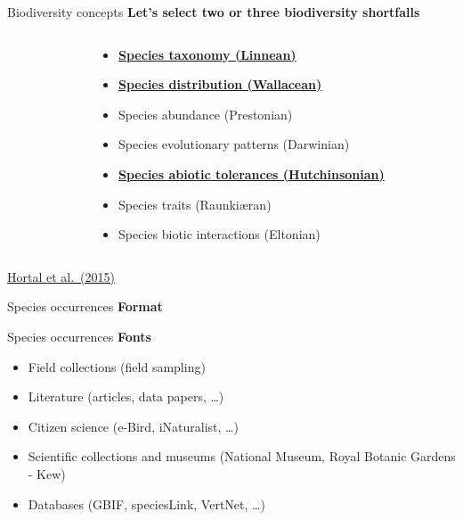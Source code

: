 \documentclass[
  ignorenonframetext,
]{beamer}
\providecommand{\tightlist}{%
  \setlength{\itemsep}{0pt}\setlength{\parskip}{0pt}}\usepackage{longtable,booktabs,array}
\begin{document}
\begin{frame}{Biodiversity concepts}
\label{biodiversity-concepts-7}
\textbf{Let's select two or three biodiversity shortfalls}

\begin{columns}[T]
\begin{column}{0.55\textwidth}
\end{column}

\begin{column}{0.45\textwidth}
\begin{itemize}
\tightlist
\item
  \ul{\textbf{Species taxonomy (Linnean)}}
\item
  \ul{\textbf{Species distribution (Wallacean)}}
\item
  Species abundance (Prestonian)
\item
  Species evolutionary patterns (Darwinian)
\item
  \ul{\textbf{Species abiotic tolerances (Hutchinsonian)}}
\item
  Species traits (Raunkiæran)
\item
  Species biotic interactions (Eltonian)
\end{itemize}
\end{column}
\end{columns}

\href{https://doi.org/10.1146/annurev-ecolsys-112414-054400}{Hortal et
al.~(2015)}
\end{frame}

\begin{frame}{Species occurrences}
\label{species-occurrences}
\textbf{Format}
\end{frame}

\begin{frame}{Species occurrences}
\label{species-occurrences-1}
\textbf{Fonts}

\begin{itemize}
\tightlist
\item
  Field collections (field sampling)
\item
  Literature (articles, data papers, \ldots)
\item
  Citizen science (e-Bird, iNaturalist, \ldots)
\item
  Scientific collections and museums (National Museum, Royal Botanic
  Gardens - Kew)
\item
  Databases (GBIF, speciesLink, VertNet, \ldots)
\end{itemize}
\end{frame}
\end{document}
